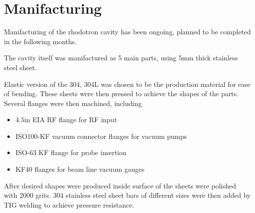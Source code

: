 \documentclass[a4paper,oneside,12pt]{report}
\numberwithin{equation}{chapter}
\begin{document}
\newpage


\section{Manifacturing}

Manifacturing of the rhodotron cavity has been ongoing, planned to be completed in the following months.

The cavity itself was manifactured as 5 main parts, using 5mm thick stainless steel sheet. 

Elastic version of the 304, 304L was chosen to be the production material for ease of bending.
These sheets were then pressed to achieve the shapes of the parts. 
Several flanges were then machined, including
\begin{itemize}
    \item $4.5$in EIA RF flange for RF input
    \item ISO100-KF vacuum connector flanges for vacuum pumps
    \item ISO-63 KF flange for probe insertion
    \item KF40 flanges for beam line vacuum gauges
\end{itemize}
After desired shapes were produced inside surface of the sheets were polished with 2000 grits. 
304 stainless steel sheet bars of different sizes were then added by 
TIG welding to achieve pressure resistance.
\end{document}
